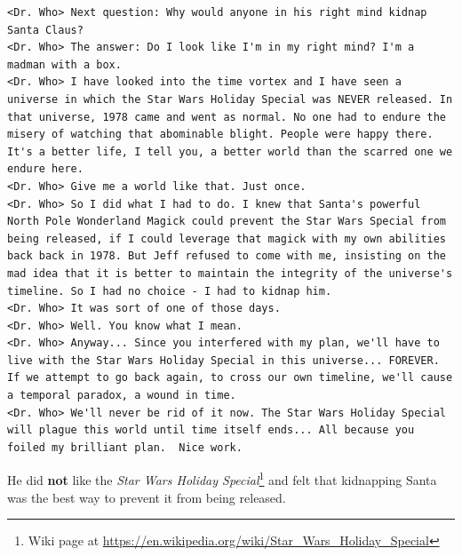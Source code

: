 \documentclass[writeup.tex]{subfiles}
\begin{document}
\begin{lstlisting}[backgroundcolor=\color{gray!25},basicstyle=\ttfamily,columns=fullflexible,breaklines]
<Dr. Who> Next question: Why would anyone in his right mind kidnap Santa Claus?
<Dr. Who> The answer: Do I look like I'm in my right mind? I'm a madman with a box.
<Dr. Who> I have looked into the time vortex and I have seen a universe in which the Star Wars Holiday Special was NEVER released. In that universe, 1978 came and went as normal. No one had to endure the misery of watching that abominable blight. People were happy there. It's a better life, I tell you, a better world than the scarred one we endure here.
<Dr. Who> Give me a world like that. Just once.
<Dr. Who> So I did what I had to do. I knew that Santa's powerful North Pole Wonderland Magick could prevent the Star Wars Special from being released, if I could leverage that magick with my own abilities back back in 1978. But Jeff refused to come with me, insisting on the mad idea that it is better to maintain the integrity of the universe's timeline. So I had no choice - I had to kidnap him.
<Dr. Who> It was sort of one of those days.
<Dr. Who> Well. You know what I mean.
<Dr. Who> Anyway... Since you interfered with my plan, we'll have to live with the Star Wars Holiday Special in this universe... FOREVER.  If we attempt to go back again, to cross our own timeline, we'll cause a temporal paradox, a wound in time.
<Dr. Who> We'll never be rid of it now. The Star Wars Holiday Special will plague this world until time itself ends... All because you foiled my brilliant plan.  Nice work.
		\end{lstlisting}
		
		He did \textbf{not}	like the \textit{Star Wars Holiday Special}\footnote{Wiki page at \url{https://en.wikipedia.org/wiki/Star_Wars_Holiday_Special}} and felt that kidnapping Santa was the best way to prevent it from being released.
\end{document}
